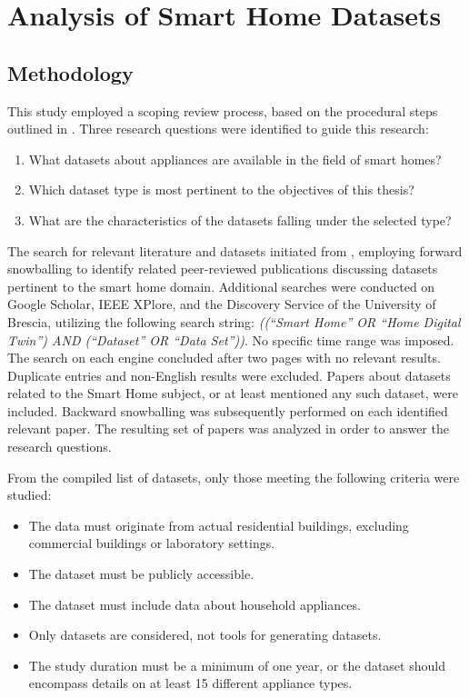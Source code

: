 \chapter{Analysis of Smart Home Datasets}\label{ch:analysis_of_smart_home_datasets}

\section{Methodology}\label{sec:methodology}

This study employed a scoping review process, based on the procedural steps outlined in \parencite{makStepsConductingScoping2022}. Three research questions were identified to guide this research:
\begin{enumerate}[label={RQ\arabic*.}, leftmargin=3.5em]
    \item What datasets about appliances are available in the field of smart homes?
    \item Which dataset type is most pertinent to the objectives of this thesis?
    \item What are the characteristics of the datasets falling under the selected type?
\end{enumerate}

The search for relevant literature and datasets initiated from \parencite{barkerSmartOpenData2012}, employing forward snowballing to identify related peer-reviewed publications discussing datasets pertinent to the smart home domain. Additional searches were conducted on Google Scholar, IEEE XPlore, and the Discovery Service of the University of Brescia, utilizing the following search string: \textit{((``Smart Home'' OR ``Home Digital Twin'') AND (``Dataset'' OR ``Data Set''))}. No specific time range was imposed. The search on each engine concluded after two pages with no relevant results. Duplicate entries and non-English results were excluded. Papers about datasets related to the Smart Home subject, or at least mentioned any such dataset, were included. Backward snowballing was subsequently performed on each identified relevant paper. The resulting set of papers was analyzed in order to answer the research questions.

From the compiled list of datasets, only those meeting the following criteria were studied:
\begin{itemize}
    \item The data must originate from actual residential buildings, excluding commercial buildings or laboratory settings.
    \item The dataset must be publicly accessible.
    \item The dataset must include data about household appliances.
    \item Only datasets are considered, not tools for generating datasets.
    \item The study duration must be a minimum of one year, or the dataset should encompass details on at least 15 different appliance types.
\end{itemize}

